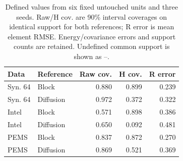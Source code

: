 \begin{table}[t]\centering\caption{Defined values from six fixed untouched units and three seeds. Raw/H cov. are 90\% interval coverages on identical support for both references; R error is mean element RMSE. Energy/covariance errors and support counts are retained. Undefined common support is shown as --.}\label{tab:fidelity}\small
\begin{tabular}{llrrr}\toprule Data & Reference & Raw cov. & H cov. & R error\\\midrule
Syn. 64 & Block & 0.880 & 0.899 & 0.239 \\
Syn. 64 & Diffusion & 0.972 & 0.372 & 0.322 \\
Intel & Block & 0.571 & 0.898 & 0.386 \\
Intel & Diffusion & 0.650 & 0.092 & 0.481 \\
PEMS & Block & 0.837 & 0.872 & 0.270 \\
PEMS & Diffusion & 0.869 & 0.521 & 0.369 \\
\bottomrule\end{tabular}\end{table}
